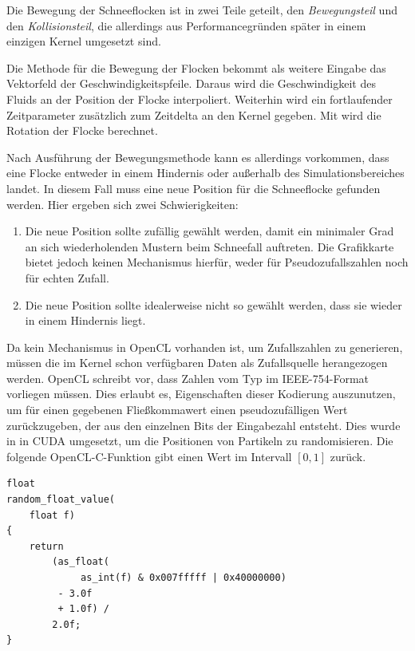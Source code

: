 Die Bewegung der Schneeflocken ist in zwei Teile geteilt, den
\emph{Bewegungsteil} und den \emph{Kollisionsteil}, die allerdings aus
Performancegründen später in einem einzigen Kernel umgesetzt sind.

Die Methode für die Bewegung der Flocken bekommt als weitere Eingabe
das Vektorfeld der Geschwindigkeitspfeile. Daraus wird die
Geschwindigkeit des Fluids an der Position der Flocke
interpoliert. Weiterhin wird ein fortlaufender Zeitparameter
 zusätzlich zum Zeitdelta 
an den Kernel gegeben. Mit  wird die Rotation der
Flocke berechnet.

Nach Ausführung der Bewegungsmethode kann es allerdings vorkommen,
dass eine Flocke entweder in einem Hindernis oder außerhalb des
Simulationsbereiches landet. In diesem Fall muss eine neue Position
für die Schneeflocke gefunden werden. Hier ergeben sich zwei
Schwierigkeiten:

\begin{enumerate}
\item Die neue Position sollte zufällig gewählt werden, damit ein
minimaler Grad an sich wiederholenden Mustern beim Schneefall
auftreten. Die Grafikkarte bietet jedoch keinen Mechanismus hierfür,
weder für Pseudozufallszahlen noch für echten Zufall.
\item Die neue Position sollte idealerweise nicht so gewählt werden,
dass sie wieder in einem Hindernis liegt.
\end{enumerate}

Da kein Mechanismus in OpenCL vorhanden ist, um Zufallszahlen zu
generieren, müssen die im Kernel schon verfügbaren Daten als
Zufallsquelle herangezogen werden. OpenCL schreibt vor, dass Zahlen
vom Typ  im IEEE-754-Format vorliegen
müssen. Dies erlaubt es, Eigenschaften dieser Kodierung auszunutzen,
um für einen gegebenen Fließkommawert einen pseudozufälligen Wert
zurückzugeben, der aus den einzelnen Bits der Eingabezahl
entsteht. Dies wurde in \cite{Eidissen2009} in CUDA umgesetzt, um die
Positionen von Partikeln zu randomisieren. Die folgende
OpenCL-C-Funktion gibt einen Wert im Intervall $[0,1]$ zurück.

\begin{verbatim}
float
random_float_value(
    float f)
{
    return
        (as_float(
             as_int(f) & 0x007fffff | 0x40000000)
         - 3.0f
         + 1.0f) /
        2.0f;
}
\end{verbatim}

